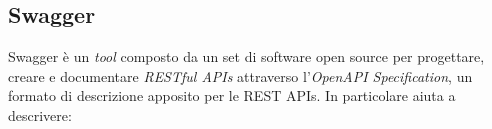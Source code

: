 \subsection{Swagger}
Swagger è un \emph{tool} composto da un set di software open source per progettare, creare e documentare \emph{RESTful APIs} attraverso l’\emph{OpenAPI Specification}, un formato di descrizione apposito per le REST APIs. In particolare aiuta a descrivere:





